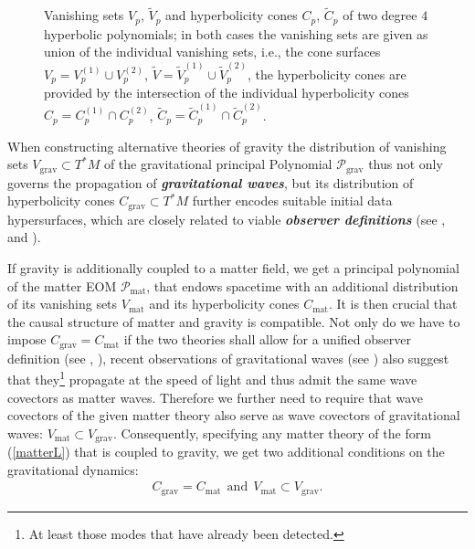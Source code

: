 \documentclass[%
preprint,
titlepage,
nofootinbib,
amsmath,amssymb,
showkeys,
aps,
prd,
floatfix,
]{revtex4-2}
\newcommand{\coneback}[4][]{
  \draw[canvas is xy plane at z=#2, #1] (45-#4:#3) arc (45-#4:225+#4:#3) -- (O) --cycle;
  }
\newcommand{\conefront}[4][]{
  \draw[canvas is xy plane at z=#2, #1] (45-#4:#3) arc (45-#4:-135+#4:#3) -- (O) --cycle;
  }
\begin{document}
\begin{figure}
\begin{minipage}{0.45\textwidth}
\begin{center}
\end{center}
\end{minipage}
    \caption{Vanishing sets $V_p$, $\widetilde{V}_p$ and hyperbolicity cones $C_p$, $\widetilde{C}_p$ of two degree $4$ hyperbolic polynomials; in both cases the vanishing sets are given as union of the individual vanishing sets, i.e., the cone surfaces $V_p = V_p^{(1)} \cup V_p^{(2)}$, $\widetilde{V} = \widetilde{V}_p^{(1)} \cup \widetilde{V}_p^{(2)}$, the hyperbolicity cones are provided by the intersection of the individual hyperbolicity cones $C_p = C_p^{(1)} \cap C_p^{(2)}$,  $\widetilde{C}_p = \widetilde{C}_p^{(1)} \cap \widetilde{C}_p^{(2)}$.}
    \label{Poly}
\end{figure}

When constructing alternative theories of gravity the distribution of vanishing sets $V_{\text{grav}} \subset T^{\ast}M$ of the gravitational principal Polynomial $\mathcal{P}_{\text{grav}}$ thus not only governs the propagation of \textit{\textbf{gravitational waves}}, but its  distribution of hyperbolicity cones $C_{\text{grav}}\subset T^{\ast}M$ further encodes suitable initial data hypersurfaces, which are closely related to viable \textit{\textbf{observer definitions}} (see \cite{2018PhRvD..97h4036D}, \cite{2011PhRvD..83d4047R} and \cite{Rivera}). 

If gravity is additionally coupled to a matter field, we get a principal polynomial of the matter EOM $\mathcal{P}_{\text{mat}}$, that endows spacetime with an additional distribution of its vanishing sets $V_{\text{mat}}$ and its hyperbolicity cones $C_{\text{mat}}$. It is then crucial that the causal structure of matter and gravity is compatible. 
Not only do we have to impose $C_{\text{grav}} = C_{\text{mat}}$ if the two theories shall allow for a unified observer definition (see \cite{Rivera}, \cite{2011PhRvD..83d4047R}), recent observations of gravitational waves (see \cite{2017ApJ...848L..13A}) also suggest that they\footnote{At least those modes that have already been detected.} propagate at the speed of light and thus admit the same wave covectors as matter waves.
Therefore we further need to require that wave covectors of the given matter theory also serve as wave covectors of gravitational waves: $V_{\text{mat}} \subset V_{\text{grav}}$.
Consequently, specifying any matter theory of the form (\ref{matterL}) that is coupled to gravity, we get two additional conditions on the gravitational dynamics:
\begin{align}\label{A2}
    C_{\text{grav}} = C_{\text{mat}} \ \ \text{and} \ \ V_{\text{mat}} \subset V_{\text{grav}}.\tag{Axiom 2}
\end{align}
\end{document}
